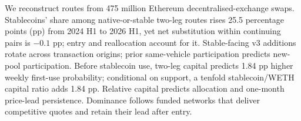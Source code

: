 We reconstruct routes from 475 million Ethereum decentralised-exchange swaps. Stablecoins' share among native-or-stable two-leg routes rises 25.5 percentage points (pp) from 2024 H1 to 2026 H1, yet net substitution within continuing pairs is \(-0.1\) pp; entry and reallocation account for it. Stable-facing v3 additions rotate across transaction origins; prior same-vehicle participation predicts new-pool participation. Before stablecoin use, two-leg capital predicts 1.84 pp higher weekly first-use probability; conditional on support, a tenfold stablecoin/WETH capital ratio adds 1.84 pp. Relative capital predicts allocation and one-month price-lead persistence. Dominance follows funded networks that deliver competitive quotes and retain their lead after entry.
